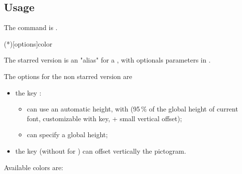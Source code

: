 \documentclass[english,11pt,a4paper]{article}
\begin{document}
\subsection{Usage}

The command is .

\begin{codehigh}[language=latex/latex2,style/main=cyan!10,style/code=cyan!10]
\ColorBelt(*)[options]{color}
\end{codehigh}

The starred version is an "alias" for a , with optionals parameters in \MontreCode{[...]}.

\medskip

The options for the non starred version are

\begin{itemize}[leftmargin=*]
	\item the key :
	\begin{itemize}
		\item can use an automatic height, with  (95\,\% of the global height of current font, customizable with  key, + small vertical offset);
		\item can specify a global height;
	\end{itemize}
	\item the key  (without  for ) can offset vertically the pictogram.
\end{itemize}

Available colors are:
\end{document}

